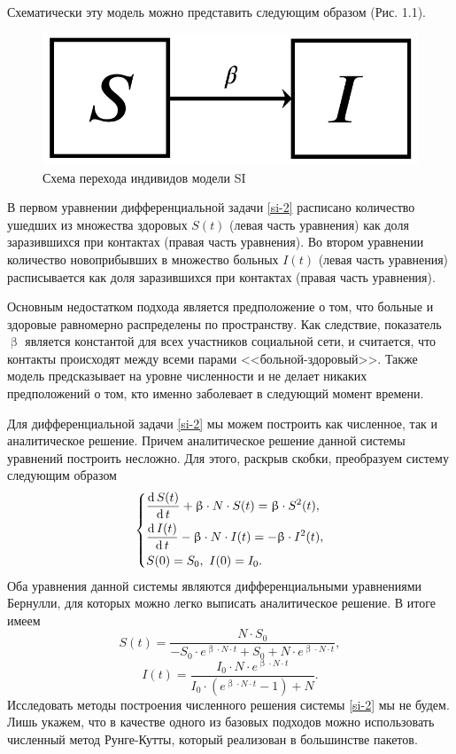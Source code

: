\documentclass[a4paper, 14pt]{extreport}
\renewcommand{\beta}{\upbeta}
\renewcommand{\d}{\operatorname{d}}
\begin{document}
	Схематически эту модель можно представить следующим образом (Рис. 1.1).
	\begin{figure}[h]
		\centering
		\includegraphics[scale=0.25]{images/img05}
		\caption{Схема перехода индивидов модели SI}
		\label{fig:img05}
	\end{figure}
	
	В первом уравнении дифференциальной задачи \eqref{si-2} расписано количество ушедших из множества здоровых $S(t)$ (левая часть уравнения) как доля заразившихся при контактах (правая часть уравнения). Во втором уравнении количество новоприбывших в множество больных $I(t)$ (левая часть уравнения) расписывается как доля заразившихся при контактах (правая часть уравнения). 
	
	Основным недостатком подхода является предположение о том, что больные и здоровые равномерно распределены по пространству. Как следствие, показатель $\beta$ является константой для всех участников социальной сети, и считается, что контакты происходят между всеми парами <<больной-здоровый>>. Также модель предсказывает на уровне численности и не делает никаких предположений о том, кто именно заболевает в следующий момент времени.
	
	Для дифференциальной задачи \eqref{si-2} мы можем построить как численное, так и аналитическое решение. Причем аналитическое решение данной системы уравнений построить несложно. Для этого, раскрыв скобки, преобразуем систему следующим образом
	$$
		\begin{dcases}
			\dfrac{\d S(t)}{\d t} + \beta\cdot  N \cdot S(t) = \beta \cdot S^2(t),\\
			\dfrac{\d I(t)}{\d t} - \beta\cdot N\cdot I(t) =  -\beta\cdot  I^2(t),\\
			S(0) = S_0,\ I(0) = I_0.
		\end{dcases}
	$$
	Оба уравнения данной системы являются дифференциальными уравнениями Бернулли, для которых можно легко выписать аналитическое решение. В итоге имеем
	\begin{equation}
		S(t) = \dfrac{N \cdot S_0}{-S_0 \cdot e^{\beta \cdot N\cdot t} + S_0 + N\cdot e^{\beta \cdot N \cdot t}},
	\end{equation}
	\begin{equation}
		I(t) = \dfrac{I_0 \cdot N \cdot e^{\beta \cdot N \cdot t}}{I_0\cdot(e^{\beta \cdot N \cdot t} - 1) + N}.
	\end{equation}
	Исследовать методы построения численного решения системы \eqref{si-2} мы не будем. Лишь укажем, что в качестве одного из базовых подходов можно использовать численный метод Рунге-Кутты, который реализован в большинстве пакетов.
	
\end{document}
